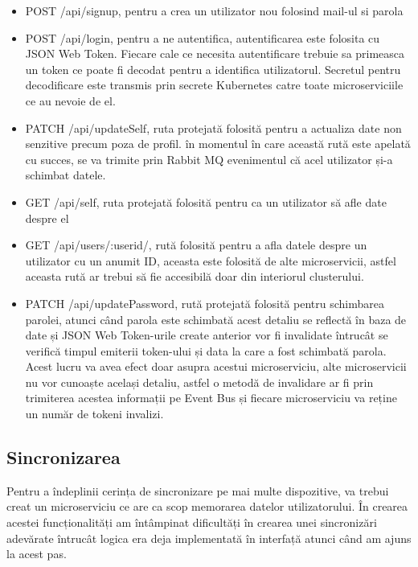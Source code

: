 \begin{itemize}
      \item POST /api/signup, pentru a crea un utilizator nou folosind mail-ul si parola
      \item POST /api/login, pentru a ne autentifica, autentificarea este folosita cu JSON Web Token.
            Fiecare cale ce necesita autentificare trebuie sa primeasca un token
            ce poate fi decodat pentru a identifica utilizatorul. Secretul pentru
            decodificare este transmis prin secrete Kubernetes catre toate microserviciile
            ce au nevoie de el.
      \item PATCH /api/updateSelf, ruta protejată folosită pentru a actualiza date non senzitive precum poza de profil.
            în momentul în care această rută este apelată cu succes, se va trimite prin Rabbit MQ evenimentul că acel utilizator și-a schimbat datele.
      \item GET /api/self, ruta protejată folosită pentru ca un utilizator să afle date despre el
      \item GET /api/users/:userid/, rută folosită pentru a afla
            datele despre un utilizator cu un anumit ID, aceasta este folosită de alte microservicii,
            astfel aceasta rută ar trebui să fie accesibilă doar din interiorul clusterului.
      \item PATCH /api/updatePassword, rută protejată folosită pentru schimbarea parolei,
            atunci când parola este schimbată acest detaliu se reflectă în baza de date și JSON Web Token-urile create anterior
            vor fi invalidate întrucât se verifică timpul emiterii token-ului și data la care a fost schimbată parola.
            Acest lucru va avea efect doar asupra acestui microserviciu, alte microservicii nu vor cunoaște același detaliu,
            astfel o metodă de invalidare ar fi prin trimiterea acestea informații pe Event Bus și fiecare microserviciu va reține un număr de tokeni invalizi.
\end{itemize}

\subsection{Sincronizarea}

Pentru a îndeplinii cerința de sincronizare pe mai multe dispozitive, va trebui creat un microserviciu
ce are ca scop memorarea datelor utilizatorului. În crearea acestei funcționalități
am întâmpinat dificultăți în crearea unei sincronizări adevărate întrucât logica
era deja implementată în interfață atunci când am ajuns la acest pas.

